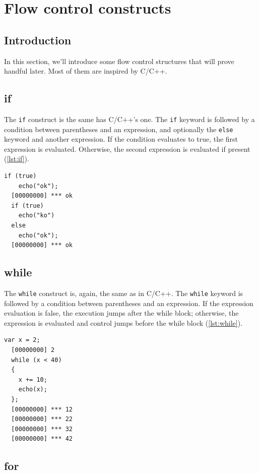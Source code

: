 \documentclass[openright,twoside,12pt]{report}
\newcommand{\C}{C\xspace}
\newcommand{\Cxx}{C++\xspace}
\newcommand{\lst}[1]{\autoref{lst:#1}}
\begin{document}
\chapter{Flow control constructs}

\section{Introduction}

In this section, we'll introduce some flow control structures that
will prove handful later. Most of them are inspired by \C/\Cxx.

\section{if}

The \texttt{if} construct is the same has \C/\Cxx's one. The
\texttt{if} keyword is followed by a condition between parentheses and
an expression, and optionally the \texttt{else} keyword and another
expression. If the condition evaluates to true, the first expression
is evaluated. Otherwise, the second expression is evaluated if
present (\lst{if}).

\begin{lstlisting}[caption=The \texttt{if} construct, label=lst:if]
  if (true)
    echo("ok");
  [00000000] *** ok
  if (true)
    echo("ko")
  else
    echo("ok");
  [00000000] *** ok
\end{lstlisting}

\section{while}

The \texttt{while} construct is, again, the same as in \C/\Cxx. The
\texttt{while} keyword is followed by a condition between parentheses
and an expression. If the expression evaluation is false, the
execution jumps after the while block; otherwise, the expression is
evaluated and control jumps before the while block (\lst{while}).

\begin{lstlisting}[caption=The \texttt{while} construct,
  label=lst:while]
  var x = 2;
  [00000000] 2
  while (x < 40)
  {
    x += 10;
    echo(x);
  };
  [00000000] *** 12
  [00000000] *** 22
  [00000000] *** 32
  [00000000] *** 42
\end{lstlisting}

\section{for}
\end{document}

